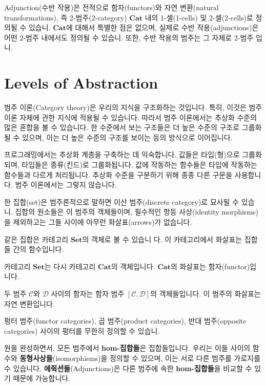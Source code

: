 \documentclass[DaoFP]{subfiles}
\begin{document}
Adjunction(수반 작용)은 전적으로 함자(functors)와 자연 변환(natural transformations), 즉 2-범주(2-category) $\mathbf{Cat}$ 내의 1-셀(1-cells) 및 2-셀(2-cells)로 정의될 수 있습니. $\mathbf{Cat}$에 대해서 특별한 점은 없으며, 실제로 수반 작용(adjunctions)은 어떤 2-범주 내에서도 정의될 수 있습니. 또한, 수반 작용의 범주는 그 자체로 2-범주 입니.

\section{Levels of Abstraction}

범주 이론(Category theory)은 우리의 지식을 구조화하는 것입니다. 특히, 이것은 범주 이론 자체에 관한 지식에 적용될 수 있습니다. 따라서 범주 이론에서는 추상화 수준의 많은 혼합을 볼 수 있습니다. 한 수준에서 보는 구조들은 더 높은 수준의 구조로 그룹화될 수 있으며, 이는 더 높은 수준의 구조를 보이는 등의 방식으로 이어집니다.

프로그래밍에서는 추상화 계층을 구축하는 데 익숙합니다. 값들은 타입(형)으로 그룹화되며, 타입들은 종류(킨드)로 그룹화됩니다. 값에 작동하는 함수들은 타입에 작동하는 함수들과 다르게 처리됩니다. 추상화 수준을 구분하기 위해 종종 다른 구문을 사용합니다. 범주 이론에서는 그렇지 않습니다.

한 집합(set)은 범주론적으로 말하면 이산 범주(discrete category)로 묘사될 수 있습니. 집합의 원소들은 이 범주의 객체들이며, 필수적인 항등 사상(identity morphisms)을 제외하고는 그들 사이에 아무런 화살표(arrows)가 없습니다.

같은 집합은 카테고리 $\mathbf{Set}$의 객체로 볼 수 있습니 다. 이 카테고리에서 화살표는 집합들 간의 함수입니다.

카테고리 $\mathbf{Set}$는 다시 카테고리 $\mathbf{Cat}$의 객체입니다. $\mathbf{Cat}$의 화살표는 함자(functor)입니다.

두 범주 $\mathcal{C}$와 $\mathcal{D}$ 사이의 함자는 함자 범주 $[\mathcal{C}, \mathcal{D}]$의 객체들입니다. 이 범주의 화살표는 자연 변환입니다.

펑터 범주(functor categories), 곱 범주(product categories), 반대 범주(opposite categories) 사이의 펑터를 무한히 정의할 수 있습니.

원을 완성하면서, 모든 범주에서 \textbf{hom-집합들}은 집합들입니다. 우리는 이들 사이의 함수와 \textbf{동형사상들}(isomorphisms)을 정의할 수 있으며, 이는 서로 다른 범주를 가로지를 수 있습니다. \textbf{에쥑션들}(Adjunctions)은 다른 범주에 속한 \textbf{hom-집합들}을 비교할 수 있기 때문에 가능합니다.
\end{document}

